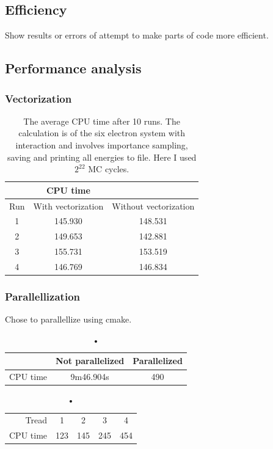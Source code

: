 \subsection{Efficiency}

Show results or errors of attempt to make parts of code more efficient. 

\subsection{Performance analysis}

\subsubsection{Vectorization}

\begin{table}[H]\caption{The average CPU time after 10 runs. The calculation is of the six electron system with interaction and involves importance sampling, saving and printing all energies to file. Here I used $2^{22}$ MC cycles. }\label{tab:CPUtime_vectorization}
\center
\begin{tabular}{c|cc}
 & CPU time & \\ \hline
Run & With vectorization & Without vectorization \\ \hline
1 & 145.930 & 148.531 \\
2 & 149.653 & 142.881 \\
3 & 155.731 & 153.519 \\
4 & 146.769 & 146.834 \\
\end{tabular}
\end{table}

\subsubsection{Parallellization}

Chose to parallellize using cmake.


\begin{table}[H]\caption{•}\label{tab:CPUtime_parallelization}
\center
\begin{tabular}{r|cc}
& Not parallelized & Parallelized \\ \hline
CPU time & 9m46.904s & 490 \\
\end{tabular}
\end{table}

\begin{table}[H]\caption{•}\label{tab:CPUtime_treads}
\center
\begin{tabular}{r|cccc}
Tread & 1 & 2 & 3 & 4 \\
CPU time & 123 & 145 & 245 & 454 \\
\end{tabular}\\
\end{table}